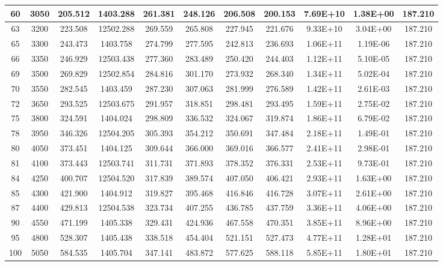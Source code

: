 \documentclass{article}
\begin{document}
\begin{center}
\begin{longtable}{|c|c|c|c|c|c|c|c|c|c|c|}
60	&	3050	&	205.512	&	1403.288	&	261.381	&	248.126	&	206.508	&	200.153	&	7.69E+10	&	1.38E+00	&	187.210	\\	\hline
63	&	3200	&	223.508	&	12502.288	&	269.559	&	265.808	&	227.945	&	221.676	&	9.33E+10	&	3.04E+00	&	187.210	\\	\hline
65	&	3300	&	243.473	&	1403.758	&	274.799	&	277.595	&	242.813	&	236.693	&	1.06E+11	&	1.19E-06	&	187.210	\\	\hline
66	&	3350	&	246.929	&	12503.438	&	277.360	&	283.489	&	250.420	&	244.403	&	1.12E+11	&	5.10E-05	&	187.210	\\	\hline
69	&	3500	&	269.829	&	12502.854	&	284.816	&	301.170	&	273.932	&	268.340	&	1.34E+11	&	5.02E-04	&	187.210	\\	\hline
70	&	3550	&	282.545	&	1403.459	&	287.230	&	307.063	&	281.999	&	276.589	&	1.42E+11	&	2.61E-03	&	187.210	\\	\hline
72	&	3650	&	293.525	&	12503.675	&	291.957	&	318.851	&	298.481	&	293.495	&	1.59E+11	&	2.75E-02	&	187.210	\\	\hline
75	&	3800	&	324.591	&	1404.024	&	298.809	&	336.532	&	324.067	&	319.874	&	1.86E+11	&	6.79E-02	&	187.210	\\	\hline
78	&	3950	&	346.326	&	12504.205	&	305.393	&	354.212	&	350.691	&	347.484	&	2.18E+11	&	1.49E-01	&	187.210	\\	\hline
80	&	4050	&	373.451	&	1404.125	&	309.644	&	366.000	&	369.016	&	366.577	&	2.41E+11	&	2.98E-01	&	187.210	\\	\hline
81	&	4100	&	373.443	&	12503.741	&	311.731	&	371.893	&	378.352	&	376.331	&	2.53E+11	&	9.73E-01	&	187.210	\\	\hline
84	&	4250	&	400.707	&	12504.520	&	317.839	&	389.574	&	407.050	&	406.421	&	2.93E+11	&	1.63E+00	&	187.210	\\	\hline
85	&	4300	&	421.900	&	1404.912	&	319.827	&	395.468	&	416.846	&	416.728	&	3.07E+11	&	2.61E+00	&	187.210	\\	\hline
87	&	4400	&	429.813	&	12504.538	&	323.734	&	407.255	&	436.785	&	437.759	&	3.36E+11	&	4.06E+00	&	187.210	\\	\hline
90	&	4550	&	471.199	&	1405.338	&	329.431	&	424.936	&	467.558	&	470.351	&	3.85E+11	&	8.96E+00	&	187.210	\\	\hline
95	&	4800	&	528.307	&	1405.438	&	338.518	&	454.404	&	521.151	&	527.473	&	4.77E+11	&	1.28E+01	&	187.210	\\	\hline
100	&	5050	&	584.535	&	1405.704	&	347.141	&	483.872	&	577.625	&	588.118	&	5.85E+11	&	1.80E+01	&	187.210	\\	\hline

\end{longtable}
\end{center}
\end{document}
